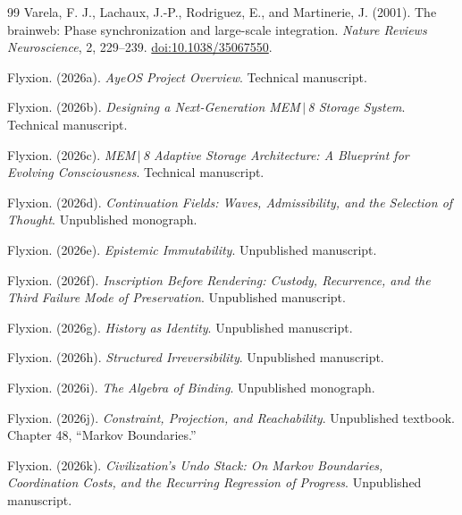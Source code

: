 \documentclass[11pt]{article}
\begin{document}
\begin{thebibliography}{99}
Varela, F. J., Lachaux, J.-P., Rodriguez, E., and Martinerie, J. (2001). The brainweb: Phase synchronization and large-scale integration. \emph{Nature Reviews Neuroscience}, 2, 229--239. \href{https://doi.org/10.1038/35067550}{doi:10.1038/35067550}.

Flyxion. (2026a). \emph{AyeOS Project Overview}. Technical manuscript.

Flyxion. (2026b). \emph{Designing a Next-Generation MEM\,$|$\,8 Storage System}. Technical manuscript.

Flyxion. (2026c). \emph{MEM\,$|$\,8 Adaptive Storage Architecture: A Blueprint for Evolving Consciousness}. Technical manuscript.

Flyxion. (2026d). \emph{Continuation Fields: Waves, Admissibility, and the Selection of Thought}. Unpublished monograph.

Flyxion. (2026e). \emph{Epistemic Immutability}. Unpublished manuscript.

Flyxion. (2026f). \emph{Inscription Before Rendering: Custody, Recurrence, and the Third Failure Mode of Preservation}. Unpublished manuscript.

Flyxion. (2026g). \emph{History as Identity}. Unpublished manuscript.

Flyxion. (2026h). \emph{Structured Irreversibility}. Unpublished manuscript.

Flyxion. (2026i). \emph{The Algebra of Binding}. Unpublished monograph.

Flyxion. (2026j). \emph{Constraint, Projection, and Reachability}. Unpublished textbook. Chapter 48, ``Markov Boundaries.''

Flyxion. (2026k). \emph{Civilization's Undo Stack: On Markov Boundaries, Coordination Costs, and the Recurring Regression of Progress}. Unpublished manuscript.

\end{thebibliography}
\end{document}
